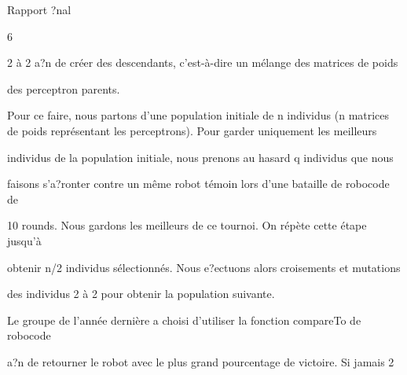 \documentclass[a4paper,portrait,12pt]{article}
\begin{document}
\begin{flushleft}
\newpage
Rapport ?nal
\end{flushleft}





6





\begin{flushleft}
2 \`{a} 2 a?n de cr\'{e}er des descendants, c'est-\`{a}-dire un m\'{e}lange des matrices de poids
\end{flushleft}


\begin{flushleft}
des perceptron parents.
\end{flushleft}


\begin{flushleft}
Pour ce faire, nous partons d'une population initiale de n individus (n matrices de poids repr\'{e}sentant les perceptrons). Pour garder uniquement les meilleurs
\end{flushleft}


\begin{flushleft}
individus de la population initiale, nous prenons au hasard q individus que nous
\end{flushleft}


\begin{flushleft}
faisons s'a?ronter contre un m\^{e}me robot t\'{e}moin lors d'une bataille de robocode de
\end{flushleft}


\begin{flushleft}
10 rounds. Nous gardons les meilleurs de ce tournoi. On r\'{e}p\`{e}te cette \'{e}tape jusqu'\`{a}
\end{flushleft}


\begin{flushleft}
obtenir n/2 individus s\'{e}lectionn\'{e}s. Nous e?ectuons alors croisements et mutations
\end{flushleft}


\begin{flushleft}
des individus 2 \`{a} 2 pour obtenir la population suivante.
\end{flushleft}


\begin{flushleft}
Le groupe de l'ann\'{e}e derni\`{e}re a choisi d'utiliser la fonction compareTo de robocode
\end{flushleft}


\begin{flushleft}
a?n de retourner le robot avec le plus grand pourcentage de victoire. Si jamais 2
\end{flushleft}
\end{document}
